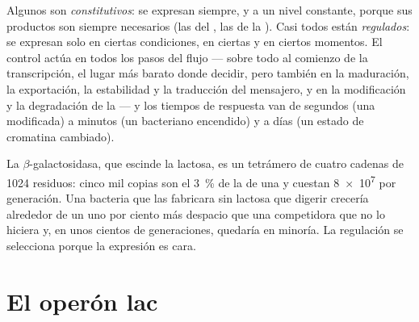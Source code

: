 \begin{proposition}\label{prop:b1:expression-control:levels}
Algunos  son \emph{constitutivos}: se expresan siempre, y a un nivel
constante, porque sus productos son siempre necesarios (las  del
, las  de la ). Casi todos están \emph{regulados}:
se expresan solo en ciertas condiciones, en ciertas  y en ciertos
momentos. El control actúa en todos los pasos del flujo --- sobre todo al
comienzo de la transcripción, el lugar más barato donde decidir, pero
también en la maduración, la exportación, la estabilidad y la traducción del
mensajero, y en la modificación y la degradación de la  --- y los
tiempos de respuesta van de segundos (una  modificada) a minutos (un
 bacteriano encendido) y a días (un estado de cromatina cambiado).
\end{proposition}

\begin{example}\label{ex:b1:expression-control:economy}
La  $\beta$-galactosidasa, que escinde la lactosa, es un tetrámero de
cuatro cadenas de \qty{1024}{} residuos: cinco mil copias son el
\qty{3}{\%} de la  de una  y cuestan \qty{8e7}{}  por
generación. Una bacteria que las fabricara sin lactosa que digerir crecería
alrededor de un uno por ciento más despacio que una competidora que no lo
hiciera y, en unos cientos de generaciones, quedaría en minoría. La
regulación se selecciona porque la expresión es cara.
\end{example}

\section{El operón lac}

